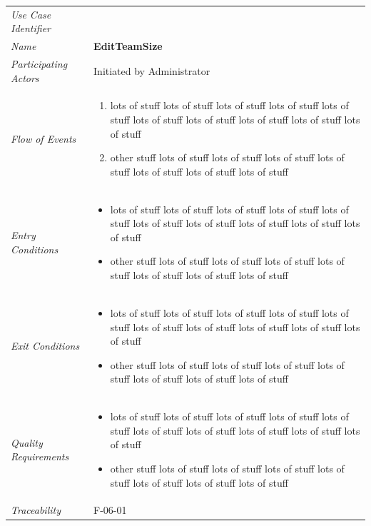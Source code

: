 \documentclass[12pt,letterpaper]{article}
\begin{document}
\begin{center}
	\begin{tabu} to 
		\toprule
		Use Case Identifier & \editteamsize{} \\
		Name & {\bf EditTeamSize} \\
		Participating Actors & Initiated by Administrator \\
		Flow of Events & 
	    \begin{enumerate}[topsep=-1em]
		    \item lots of stuff lots of stuff lots of stuff lots of stuff lots of stuff lots of stuff lots of stuff lots of stuff lots of stuff lots of stuff
		    \item other stuff lots of stuff lots of stuff lots of stuff lots of stuff lots of stuff lots of stuff lots of stuff
		\end{enumerate} \\

		Entry Conditions &
		\begin{itemize}[topsep=-1em]
		    \item lots of stuff lots of stuff lots of stuff lots of stuff lots of stuff lots of stuff lots of stuff lots of stuff lots of stuff lots of stuff
		    \item other stuff lots of stuff lots of stuff lots of stuff lots of stuff lots of stuff lots of stuff lots of stuff
        \end{itemize} \\

		Exit Conditions &
		\begin{itemize}[topsep=-1em]
		    \item lots of stuff lots of stuff lots of stuff lots of stuff lots of stuff lots of stuff lots of stuff lots of stuff lots of stuff lots of stuff
		    \item other stuff lots of stuff lots of stuff lots of stuff lots of stuff lots of stuff lots of stuff lots of stuff
        \end{itemize} \\

		Quality Requirements &
		\begin{itemize}[topsep=-1em]
		    \item lots of stuff lots of stuff lots of stuff lots of stuff lots of stuff lots of stuff lots of stuff lots of stuff lots of stuff lots of stuff
		    \item other stuff lots of stuff lots of stuff lots of stuff lots of stuff lots of stuff lots of stuff lots of stuff
        \end{itemize} \\

		Traceability & F-06-01 \\
		\toprule
	\end{tabu}
\end{center}
\end{document}
